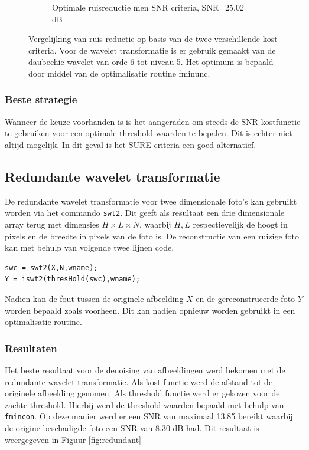 \begin{figure}
\begin{subfigure}[b]{0.4\textwidth}
        \caption{Optimale ruisreductie men SNR criteria, SNR=25.02 dB}
        \label{fig:roster_inpainting}
    \end{subfigure}
    \caption{Vergelijking van ruis reductie op basis van de twee verschillende kost criteria. Voor de wavelet transformatie is er gebruik gemaakt van de daubechie wavelet van orde 6 tot niveau 5. Het optimum is bepaald door middel van de optimalisatie routine fminunc.}\label{fig:sure_snr}
\end{figure}

\subsubsection{Beste strategie}

Wanneer de keuze voorhanden is is het aangeraden om steeds de SNR kostfunctie te gebruiken voor een optimale threshold waarden te bepalen.
Dit is echter niet altijd mogelijk. In dit geval is het SURE criteria een goed alternatief.





\subsection{Redundante wavelet transformatie}


De redundante wavelet transformatie voor twee dimensionale foto's kan gebruikt worden via het commando \verb|swt2|.
Dit geeft als resultaat een drie dimensionale array terug met dimensies $ H\times L \times N $, waarbij $ H, L $ respectievelijk de hoogt in pixels en de breedte in pixels van de foto is.
De reconstructie van een ruizige foto kan met behulp van volgende twee lijnen code.
\begin{verbatim}
swc = swt2(X,N,wname);
Y = iswt2(thresHold(swc),wname);
\end{verbatim}
Nadien kan de fout tussen de originele afbeelding $ X $ en de gereconstrueerde foto $ Y $ worden bepaald zoals voorheen.
Dit kan nadien opnieuw worden gebruikt in een optimalisatie routine.

\subsubsection{Resultaten}

Het beste resultaat voor de denoising van afbeeldingen werd bekomen met de redundante wavelet transformatie.
Als kost functie werd de afstand tot de originele afbeelding genomen.
Als threshold functie werd er gekozen voor de zachte threshold.
Hierbij werd de threshold waarden bepaald met behulp van \verb|fmincon|.
Op deze manier werd er een SNR van maximaal 13.85 bereikt waarbij de origine beschadigde foto een SNR van 8.30 dB had.
Dit resultaat is weergegeven in Figuur \ref{fig:redundant}


